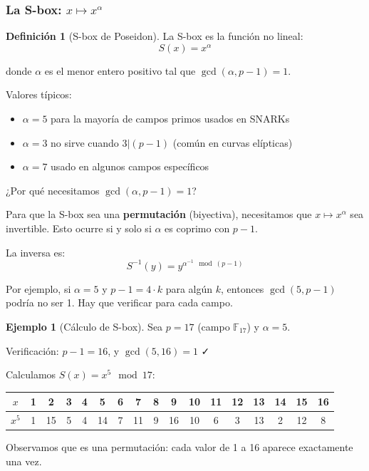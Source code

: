 \documentclass[11pt,a4paper,twoside,openright]{book}
\theoremstyle{definition}
\newtheorem{definition}{Definición}[chapter]
\newtheorem{example}{Ejemplo}[chapter]
\theoremstyle{plain}
\theoremstyle{remark}
\newcommand{\F}{\mathbb{F}}
\begin{document}
\subsubsection{La S-box: $x \mapsto x^\alpha$}

\begin{definition}[S-box de Poseidon]
La S-box es la función no lineal:
\[ S(x) = x^\alpha \]

donde $\alpha$ es el menor entero positivo tal que $\gcd(\alpha, p-1) = 1$.

Valores típicos:
\begin{itemize}
    \item $\alpha = 5$ para la mayoría de campos primos usados en SNARKs
    \item $\alpha = 3$ no sirve cuando $3 | (p-1)$ (común en curvas elípticas)
    \item $\alpha = 7$ usado en algunos campos específicos
\end{itemize}
\end{definition}

\begin{mathnote}
¿Por qué necesitamos $\gcd(\alpha, p-1) = 1$?

Para que la S-box sea una \textbf{permutación} (biyectiva), necesitamos que $x \mapsto x^\alpha$ sea invertible. Esto ocurre si y solo si $\alpha$ es coprimo con $p-1$.

La inversa es:
\[ S^{-1}(y) = y^{\alpha^{-1} \mod (p-1)} \]

Por ejemplo, si $\alpha = 5$ y $p - 1 = 4 \cdot k$ para algún $k$, entonces $\gcd(5, p-1)$ podría no ser 1. Hay que verificar para cada campo.
\end{mathnote}

\begin{example}[Cálculo de S-box]
Sea $p = 17$ (campo $\F_{17}$) y $\alpha = 5$.

Verificación: $p - 1 = 16$, y $\gcd(5, 16) = 1$ ✓

Calculamos $S(x) = x^5 \mod 17$:
\begin{center}
\begin{tabular}{c|cccccccccccccccc}
$x$ & 1 & 2 & 3 & 4 & 5 & 6 & 7 & 8 & 9 & 10 & 11 & 12 & 13 & 14 & 15 & 16 \\
\hline
$x^5$ & 1 & 15 & 5 & 4 & 14 & 7 & 11 & 9 & 16 & 10 & 6 & 3 & 13 & 2 & 12 & 8 \\
\end{tabular}
\end{center}

Observamos que es una permutación: cada valor de 1 a 16 aparece exactamente una vez.
\end{example}
\end{document}
